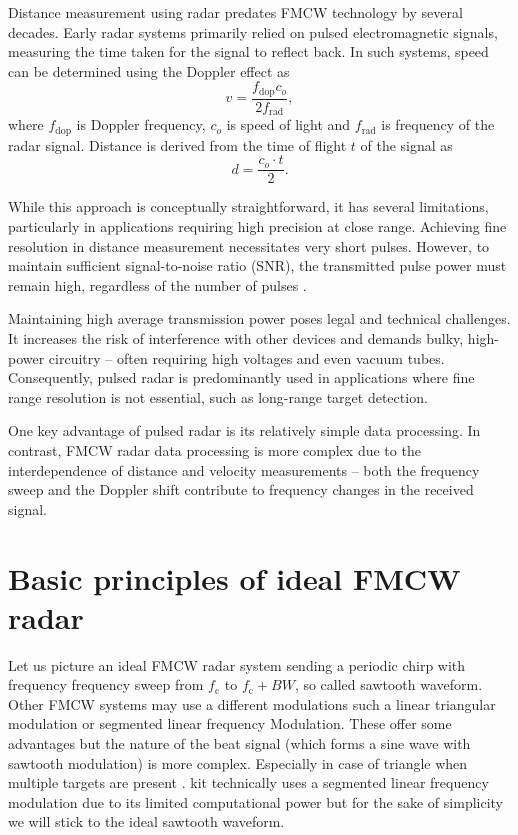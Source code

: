 Distance measurement using radar predates FMCW technology by several decades.
Early radar systems primarily relied on pulsed electromagnetic signals, measuring the time taken for the signal to reflect back.
In such systems, speed can be determined using the Doppler effect as
\begin{equation}
  v = \frac{f_\mathrm{dop} c_o}{2f_\mathrm{rad}},
  \label{eq:dopler}
\end{equation}
where $f_\mathrm{dop}$ is Doppler frequency, $c_o$ is speed of light and $f_\mathrm{rad}$ is frequency of the radar signal.
Distance is derived from the time of flight $t$ of the signal as
\begin{equation}
  d = \frac{c_o \cdot t}{2}.
  \label{eq:distance}
\end{equation}

While this approach is conceptually straightforward, it has several limitations, particularly in applications requiring high precision at close range.
Achieving fine resolution in distance measurement necessitates very short pulses.
However, to maintain sufficient signal-to-noise ratio (SNR), the transmitted pulse power must remain high, regardless of the number of pulses \cite{jankiraman2018}.

Maintaining high average transmission power poses legal and technical challenges.
It increases the risk of interference with other devices and demands bulky, high-power circuitry -- often requiring high voltages and even vacuum tubes.
Consequently, pulsed radar is predominantly used in applications where fine range resolution is not essential, such as long-range target detection.

One key advantage of pulsed radar is its relatively simple data processing.
In contrast, FMCW radar data processing is more complex due to the interdependence of distance and velocity measurements -- both the frequency sweep and the Doppler shift contribute to frequency changes in the received signal.

\section{Basic principles of ideal FMCW radar}

Let us picture an ideal FMCW radar system sending a periodic chirp with frequency frequency sweep from $f_\mathrm{c}$ to $f_\mathrm{c}+BW$, so called sawtooth waveform.
Other FMCW systems may use a different modulations such a linear triangular modulation or segmented linear frequency Modulation.
These offer some advantages but the nature of the beat signal (which forms a sine wave with sawtooth modulation) is more complex.
Especially in case of triangle when multiple targets are present \cite{jankiraman2018}.
\sidar kit technically uses a segmented linear frequency modulation due to its limited computational power \cite{sidarPRO} but for the sake of simplicity we will stick to the ideal sawtooth waveform.

